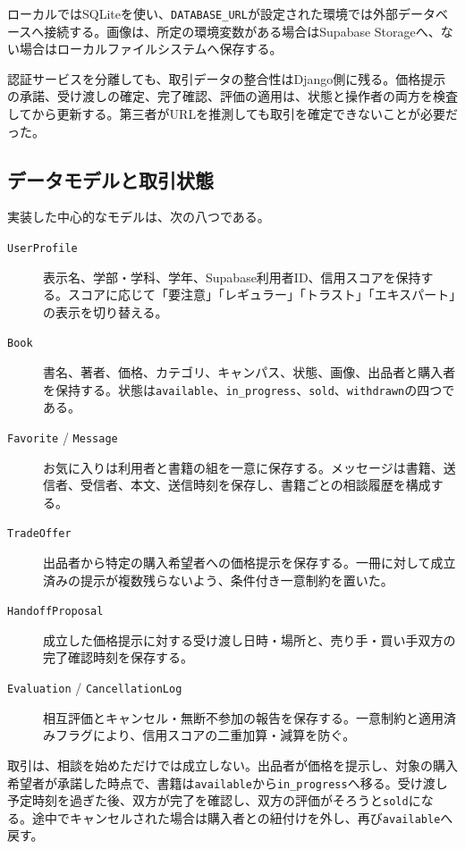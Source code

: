 \documentclass[11pt,a4paper]{jsarticle}
\begin{document}
ローカルではSQLiteを使い、\texttt{DATABASE\_URL}が設定された環境では外部データベースへ接続する。画像は、所定の環境変数がある場合はSupabase Storageへ、ない場合はローカルファイルシステムへ保存する。

認証サービスを分離しても、取引データの整合性はDjango側に残る。価格提示の承諾、受け渡しの確定、完了確認、評価の適用は、状態と操作者の両方を検査してから更新する。第三者がURLを推測しても取引を確定できないことが必要だった。

\subsection{データモデルと取引状態}
実装した中心的なモデルは、次の八つである。
\begin{description}
    \item[\texttt{UserProfile}]
    表示名、学部・学科、学年、Supabase利用者ID、信用スコアを保持する。スコアに応じて「要注意」「レギュラー」「トラスト」「エキスパート」の表示を切り替える。

    \item[\texttt{Book}]
    書名、著者、価格、カテゴリ、キャンパス、状態、画像、出品者と購入者を保持する。状態は\texttt{available}、\texttt{in\_progress}、\texttt{sold}、\texttt{withdrawn}の四つである。

    \item[\texttt{Favorite} / \texttt{Message}]
    お気に入りは利用者と書籍の組を一意に保存する。メッセージは書籍、送信者、受信者、本文、送信時刻を保存し、書籍ごとの相談履歴を構成する。

    \item[\texttt{TradeOffer}]
    出品者から特定の購入希望者への価格提示を保存する。一冊に対して成立済みの提示が複数残らないよう、条件付き一意制約を置いた。

    \item[\texttt{HandoffProposal}]
    成立した価格提示に対する受け渡し日時・場所と、売り手・買い手双方の完了確認時刻を保存する。

    \item[\texttt{Evaluation} / \texttt{CancellationLog}]
    相互評価とキャンセル・無断不参加の報告を保存する。一意制約と適用済みフラグにより、信用スコアの二重加算・減算を防ぐ。
\end{description}

取引は、相談を始めただけでは成立しない。出品者が価格を提示し、対象の購入希望者が承諾した時点で、書籍は\texttt{available}から\texttt{in\_progress}へ移る。受け渡し予定時刻を過ぎた後、双方が完了を確認し、双方の評価がそろうと\texttt{sold}になる。途中でキャンセルされた場合は購入者との紐付けを外し、再び\texttt{available}へ戻す。
\end{document}
